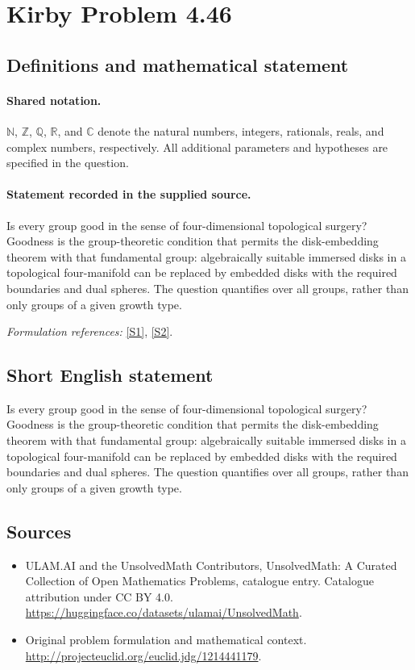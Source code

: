 \documentclass[11pt]{article}
\newcommand{\sref}[2]{\hyperlink{source:#1:#2}{[S#2]}}
\begin{document}
\section{Kirby Problem 4.46}\label{statement}

\subsection{Definitions and mathematical statement}

\paragraph{Shared notation.}$\mathbb N$, $\mathbb Z$, $\mathbb Q$, $\mathbb R$, and $\mathbb C$ denote the natural numbers, integers, rationals, reals, and complex numbers, respectively. All additional parameters and hypotheses are specified in the question.


\paragraph{Statement recorded in the supplied source.}
Is every group good in the sense of four-dimensional topological surgery? Goodness is the group-theoretic condition that permits the disk-embedding theorem with that fundamental group: algebraically suitable immersed disks in a topological four-manifold can be replaced by embedded disks with the required boundaries and dual spheres. The question quantifies over all groups, rather than only groups of a given growth type.
\par\smallskip\textit{Formulation references:} \sref{statement}{1}, \sref{statement}{2}.
\subsection{Short English statement}
Is every group good in the sense of four-dimensional topological surgery? Goodness is the group-theoretic condition that permits the disk-embedding theorem with that fundamental group: algebraically suitable immersed disks in a topological four-manifold can be replaced by embedded disks with the required boundaries and dual spheres. The question quantifies over all groups, rather than only groups of a given growth type.
\subsection{Sources}
\begin{itemize}
\item[\hypertarget{source:statement:1}{S1}] ULAM.AI and the UnsolvedMath Contributors, UnsolvedMath: A Curated Collection of Open Mathematics Problems, catalogue entry. Catalogue attribution under CC BY 4.0.
\url{https://huggingface.co/datasets/ulamai/UnsolvedMath}.
\item[\hypertarget{source:statement:2}{S2}] Original problem formulation and mathematical context.
\url{http://projecteuclid.org/euclid.jdg/1214441179}.
\end{itemize}
\label{end:statement}
\end{document}

